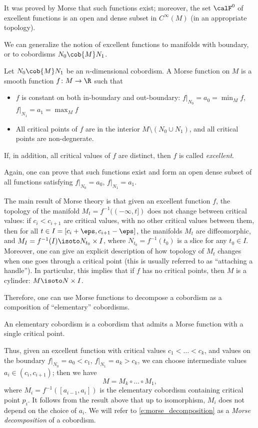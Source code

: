 It was proved by Morse that such functions exist; moreover, the set $\calF^0$
of excellent functions is an open and dense subset in $C^\infty(M)$
(in an appropriate topology).

We can generalize the notion of excellent functions to manifolds with boundary,
or to cobordisms $N_0\cob{M} N_1$.

\begin{definition}\label{d:morse-function3}
  Let $N_0\cob{M} N_1$ be an $n$-dimensional cobordism. A Morse function on $M$
  is a smooth function $f\colon M\to \R$ such that
  \begin{itemize}
    \item $f$ is constant on both in-boundary and out-boundary:
      $f|_{N_0}=a_0=\min_M f$, $f|_{N_1}=a_1=\max_M f$
    \item All critical points of $f$ are in the interior
      $M\setminus (N_0\cup N_1)$, and all critical points are non-degnerate.
  \end{itemize}
  If, in addition, all critical values of $f$ are distinct, then $f$ is called
  \emph{excellent}.
\end{definition}
 Again, one can prove
that such functions exist and form an open dense subset of all functions
satisfying $f|_{N_0}=a_0$, $f|_{N_1}=a_1$.

The main result of Morse theory is that given an excellent function $f$, the
topology of the manifold $M_t=f^{-1}((-\infty, t])$ does not change between
critical values: if $c_i<c_{i+1}$ are critical values, with no other critical
values between them, then for all $t\in I=[c_i+\eps, c_{i+1}-\eps]$, the
manifolds $M_t$ are diffeomorphic, and $M_I=f^{-1}(I)\isoto N_{t_0} \times I$,
where $N_{t_0}=f^{-1}(t_0)$ is a slice for any $t_0\in I$. Moreover, one can
give an explicit description of how topology of $M_t$ changes when one  goes
through a critical point (this is usually referred to as ``attaching a
handle''). In particular, this implies that if $f$ has no critical points, then
$M$ is a cylinder: $M\isoto N\times I$.

Therefore, one can use Morse functions to decompose a cobordism as a
composition of ``elementary'' cobordisms.
\begin{definition}\label{d:elem-cobordism}
  An elementary cobordism is a cobordism that admits a Morse  function
  with a single  critical point.
\end{definition}

Thus, given an excellent function with critical values $c_1<\dots<c_k$,
and values on the boundary $f|_{N_0}=a_0<c_1$, $f|_{N_1}=a_k>c_k$, we
can choose intermediate values $a_i\in (c_i, c_{i+1})$; then we have
\begin{equation}\label{e:morse_decomposition}
  M=M_k\circ \dots \circ M_1,
\end{equation}
where $M_i=f^{-1}([a_{i-1}, a_i])$ is the elementary cobordism containing
critical point $p_i$. It follows from the result above that up to
isomorphism, $M_i$ does not depend on the choice of $a_i$. We will refer to
\eqref{e:morse_decomposition} as a
\emph{Morse decomposition} of a cobordism.

